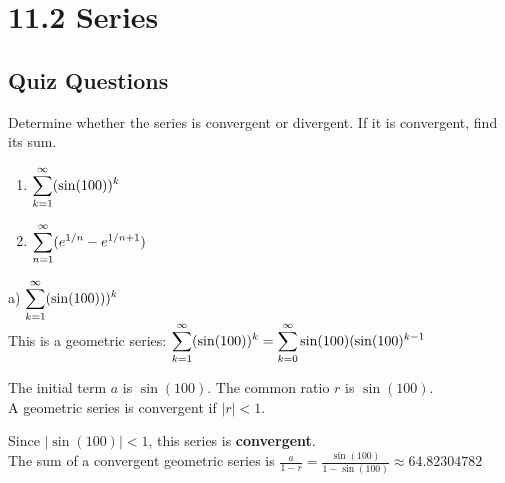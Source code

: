 \documentclass[12pt]{article}
\begin{document}
\pagebreak

\section*{11.2 Series} 
\subsection*{Quiz Questions}
Determine whether the series is convergent or divergent. If it is convergent, find its sum.
\begin{enumerate}[label=\alph*)]
\item $\mathlarger{\sum\limits_{k=1}^{\infty} (\sin(100))^{k}}$
\item $\mathlarger{\sum\limits_{n=1}^{\infty} (e^{1/n} - e^{1/{n+1}})}$
\end{enumerate}

\begin{solution}
a) $\mathlarger{\sum\limits_{k=1}^{\infty} (\sin(100)))^{k}}$ ~\\

This is a geometric series:
$\mathlarger{\sum\limits_{k=1}^{\infty} (\sin(100))^{k}} = \mathlarger{\sum\limits_{k=0}^{\infty} \sin(100)(\sin(100)^{k-1}}$ 


The initial term $a$ is $\sin(100)$.
The common ratio $r$ is $\sin(100)$. ~\\

A geometric series is convergent if $|r| < 1.$

Since $|\sin(100)| < 1$, this series is \textbf{convergent}. ~\\

The sum of a convergent geometric series is $\frac{a}{1 - r} = \frac{\sin(100)}{1 - \sin(100)} \approx \mathbf{64.82304782}$ 
\end{solution}
\end{document}
